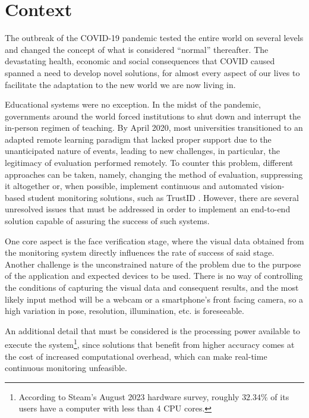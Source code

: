 \documentclass[class=report, crop=false, a4paper, 12pt]{standalone}
\begin{document}
\section{Context}
The outbreak of the COVID-19 pandemic tested the entire world on several levels and changed the concept of what is considered ``normal'' thereafter. The devastating health, economic and social consequences that COVID caused spanned a need to develop novel solutions, for almost every aspect of our lives to facilitate the adaptation to the new world we are now living in. 

\par Educational systems were no exception. In the midst of the pandemic, governments around the world forced institutions to shut down and interrupt the in-person regimen of teaching. By April 2020, most universities transitioned to an adapted remote learning paradigm \autocite{winsteadRemoteMicroelectronicsLaboratory2022} that lacked proper support due to the unanticipated nature of events, leading to new challenges, in particular, the legitimacy of evaluation performed remotely. To counter this problem, different approaches can be taken, namely, changing the method of evaluation, suppressing it altogether \autocite{barronrodriguezRemoteLearningGlobal2021} or, when possible, implement continuous and automated vision-based student monitoring solutions, such as TrustID \autocite{fariaImagebasedFaceVerification2023}. However, there are several unresolved issues that must be addressed in order to implement an end-to-end solution capable of assuring the success of such systems. 

\par One core aspect is the face verification stage, where the visual data obtained from the monitoring system directly influences the rate of success of said stage. Another challenge is the unconstrained nature of the problem due to the purpose of the application and expected devices to be used. There is no way of controlling the conditions of capturing the visual data and consequent results, and the most likely input method will be a webcam or a smartphone's front facing camera, so a high variation in pose, resolution, illumination, etc. is foreseeable. 

\par An additional detail that must be considered is the processing power available to execute the system\footnote{According to Steam's August 2023 hardware survey, roughly $32.34\%$ of its users have a computer with less than 4 CPU cores.}, since solutions that benefit from higher accuracy comes at the cost of increased computational overhead, which can make real-time continuous monitoring unfeasible.
\end{document}
